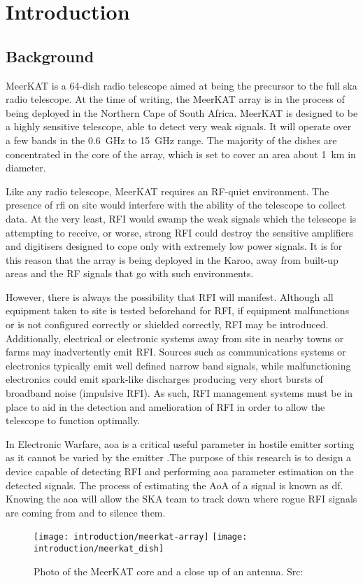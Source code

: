 \chapter{Introduction}
\label{ch:introduction}
\section{Background}
MeerKAT is a 64-dish radio telescope aimed at being the precursor to the full \gls{ska} radio telescope. At the time of writing, the MeerKAT array is in the process of being deployed in the Northern Cape of South Africa.
MeerKAT is designed to be a highly sensitive telescope, able to detect very weak signals. It will operate over a few bands in the \SI{0.6}{\giga\hertz} to \SI{15}{\giga\hertz} range. The majority of the dishes are concentrated in the core of the array, which is set to cover an area about \SI{1}{\kilo\meter} in diameter.

Like any radio telescope, MeerKAT requires an RF-quiet environment.
The presence of \gls{rfi} on site would interfere with the ability of the telescope to collect data. At the very least, RFI would swamp the weak signals which the telescope is attempting to receive, or  worse, strong RFI could destroy the sensitive amplifiers and digitisers designed to cope only with extremely low power signals.
It is for this reason that the array is being deployed in the Karoo, away from built-up areas and the RF signals that go with such environments.

However, there is always the possibility that RFI will manifest. 
Although all equipment taken to site is tested beforehand for RFI, if equipment malfunctions or is not configured correctly or shielded correctly, RFI may be introduced. Additionally, electrical or electronic systems away from site in nearby towns or farms may inadvertently emit RFI. 
Sources such as communications systems or electronics typically emit well defined narrow band signals, while malfunctioning electronics could emit spark-like discharges producing very short bursts of broadband noise (impulsive RFI).
As such, RFI management systems must be in place to aid in the detection and amelioration of RFI in order to allow the telescope to function optimally. 

In Electronic Warfare, \gls{aoa} is a critical useful parameter in hostile emitter sorting as it cannot be varied by the emitter \cite{center2012electronic}.The purpose of this research is to design a device capable of detecting RFI and performing \gls{aoa} parameter estimation on the detected signals.
The process of estimating the AoA of a signal is known as \gls{df}.
Knowing the \gls{aoa} will allow the SKA team to track down where rogue RFI signals are coming from and to silence them.

\begin{figure}[hb]
  \centering
  \texttt{[image: introduction/meerkat-array]}
  \texttt{[image: introduction/meerkat\_dish]}
  \caption{Photo of the MeerKAT core and a close up of an antenna. Src: \cite{skasawebsite}}
\end{figure}



